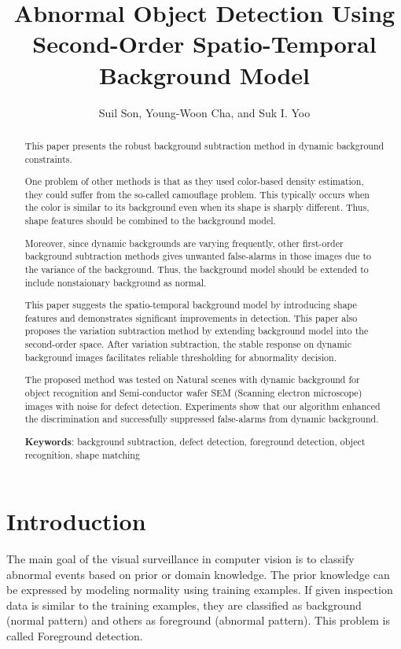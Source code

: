 \documentclass[conference]{IEEEtran}
\begin{document}
\title{Abnormal Object Detection Using Second-Order Spatio-Temporal Background Model}
\author{Suil Son, Young-Woon Cha, and Suk I. Yoo}

\maketitle

\begin{abstract}
This paper presents the robust background subtraction method in dynamic background constraints.

One problem of other methods is that as they used color-based density estimation, they could suffer from the so-called camouflage problem. This typically occurs when the color is similar to its background even when its shape is sharply different. Thus, shape features should be combined to the background model.

Moreover, since dynamic backgrounds are varying frequently, other first-order background subtraction methods gives unwanted false-alarms in those images due to the variance of the background. Thus, the background model should be extended to include nonstaionary background as normal.

This paper suggests the spatio-temporal background model by introducing shape features and demonstrates significant improvements in detection. This paper also proposes the variation subtraction method by extending background model into the second-order space. After variation subtraction, the stable response on dynamic background images facilitates reliable thresholding for abnormality decision.

The proposed method was tested on Natural scenes with dynamic background for object recognition and Semi-conductor wafer SEM (Scanning electron microscope) images with noise for defect detection. Experiments show that our algorithm enhanced the discrimination and successfully suppressed false-alarms from dynamic background.

\textbf{Keywords}: background subtraction, defect detection, foreground detection, object recognition, shape matching

\end{abstract}

\IEEEpeerreviewmaketitle


\section{Introduction}
The main goal of the visual surveillance in computer vision is to classify abnormal events based on prior or domain knowledge. The prior knowledge can be expressed by modeling normality using training examples. If given inspection data is similar to the training examples, they are classified as background (normal pattern) and others as foreground (abnormal pattern). This problem is called Foreground detection.
\end{document}
